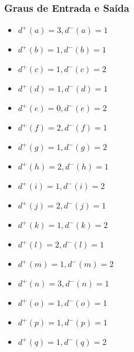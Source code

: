 \documentclass[a4paper,12pt]{article}
\begin{document}
\subsubsection*{Graus de Entrada e Saída}
\begin{multicols}{3}
\begin{itemize}[nosep]
    \item $d^{+}(a)=3, d^{-}(a)=1$
    \item $d^{+}(b)=1, d^{-}(b)=1$
    \item $d^{+}(c)=1, d^{-}(c)=2$
    \item $d^{+}(d)=1, d^{-}(d)=1$
    \item $d^{+}(e)=0, d^{-}(e)=2$
    \item $d^{+}(f)=2, d^{-}(f)=1$
    \item $d^{+}(g)=1, d^{-}(g)=2$
    \item $d^{+}(h)=2, d^{-}(h)=1$
    \item $d^{+}(i)=1, d^{-}(i)=2$
    \item $d^{+}(j)=2, d^{-}(j)=1$
    \item $d^{+}(k)=1, d^{-}(k)=2$
    \item $d^{+}(l)=2, d^{-}(l)=1$
    \item $d^{+}(m)=1, d^{-}(m)=2$
    \item $d^{+}(n)=3, d^{-}(n)=1$
    \item $d^{+}(o)=1, d^{-}(o)=1$
    \item $d^{+}(p)=1, d^{-}(p)=1$
    \item $d^{+}(q)=1, d^{-}(q)=2$
\end{itemize}
\end{multicols}

\end{document}
